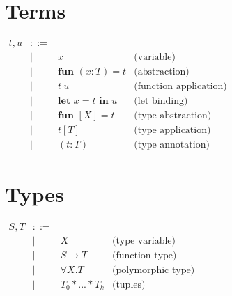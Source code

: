 \documentclass[a4paper]{article}
\begin{document}
\section{Terms}
$
\begin{array}{ccll}
t,u & ::= & & \\
& | & x & \text{(variable)} \\
& | & \textbf{fun } (x : T) = t & \text{(abstraction)} \\
& | & t \: u & \text{(function application)} \\
& | & \textbf{let } x = t \textbf{ in } u & \text{(let binding)} \\
& | & \textbf{fun }[X] = t & \text{(type abstraction)} \\
& | & t[T] & \text{(type application)} \\
& | & (t:T) & \text{(type annotation)}
\end{array}
$
\newline
\section{Types}
$
\begin{array}{ccll}
S,T & ::= & & \\
& | & X & \text{(type variable)} \\
& | & S \to T & \text{(function type)} \\
& | & \forall X. T & \text{(polymorphic type)} \\
& | & T_0 * ... * T_k & \text{(tuples)}
\end{array}
$
\end{document}
